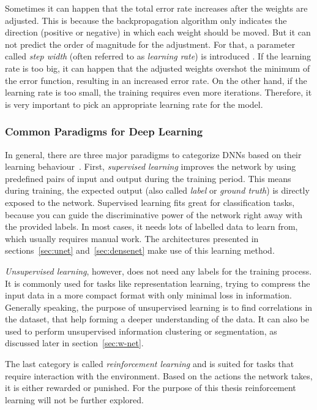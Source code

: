 Sometimes it can happen that the total error rate increases after the weights are adjusted. This is because the backpropagation algorithm only indicates the direction (positive or negative) in which each weight should be moved. But it can not predict the order of magnitude for the adjustment. For that, a parameter called \emph{step width} (often referred to as \emph{learning rate}) is introduced \cite[p.~169]{nn_intro96}. If the learning rate is too big, it can happen that the adjusted weights overshot the minimum of the error function, resulting in an increased error rate. On the other hand, if the learning rate is too small, the training requires even more iterations. Therefore, it is very important to pick an appropriate learning rate for the model.

\subsubsection{Common Paradigms for Deep Learning}
\label{sec:dl_paradigms}
In general, there are three major paradigms to categorize DNNs based on their learning behaviour~\cite[p.~214f]{dlma14}. First, \emph{supervised learning} improves the network by using predefined pairs of input and output during the training period. This means during training, the expected output (also called \emph{label} or \emph{ground truth}) is directly exposed to the network. Supervised learning fits great for classification tasks, because you can guide the discriminative power of the network right away with the provided labels. In most cases, it needs lots of labelled data to learn from, which usually requires manual work. The architectures presented in sections~\ref{sec:unet} and~\ref{sec:densenet} make use of this learning method.

\emph{Unsupervised learning}, however, does not need any labels for the training process. It is commonly used for tasks like representation learning, trying to compress the input data in a more compact format with only minimal loss in information. Generally speaking, the purpose of unsupervised learning is to find correlations in the dataset, that help forming a deeper understanding of the data. It can also be used to perform unsupervised information clustering or segmentation, as discussed later in section~\ref{sec:w-net}.

The last category is called \emph{reinforcement learning} and is suited for tasks that require interaction with the environment. Based on the actions the network takes, it is either rewarded or punished. For the purpose of this thesis reinforcement learning will not be further explored.

